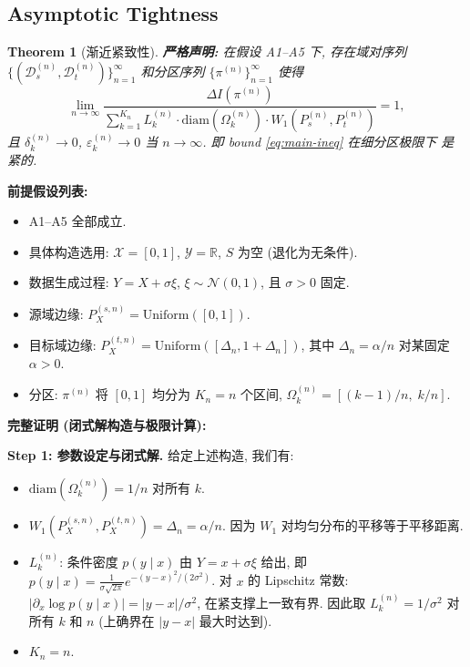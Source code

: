 \documentclass[12pt,a4paper]{article}
\newtheorem{theorem}{Theorem}[section]
\newcommand{\R}{\mathbb{R}}
\newcommand{\cX}{\mathcal{X}}
\newcommand{\cY}{\mathcal{Y}}
\newcommand{\cD}{\mathcal{D}}
\newcommand{\Wass}{W_1}
\newcommand{\diam}{\mathrm{diam}}
\begin{document}
\subsection{Asymptotic Tightness}

\begin{theorem}[渐近紧致性]\label{thm:tightness}
\textbf{严格声明:}
在假设 A1--A5 下, 存在域对序列
$\{(\cD_s^{(n)},\cD_t^{(n)})\}_{n=1}^{\infty}$ 和分区序列
$\{\pi^{(n)}\}_{n=1}^{\infty}$ 使得
\begin{equation}\label{eq:tightness}
    \lim_{n\to\infty}
    \frac{\Delta I(\pi^{(n)})}
         {\displaystyle\sum_{k=1}^{K_n}
          L_k^{(n)}\cdot\diam(\Omega_k^{(n)})\cdot
          \Wass(P^{(n)}_s,P^{(n)}_t)}
    = 1,
\end{equation}
且 $\delta_k^{(n)}\to0$, $\varepsilon_k^{(n)}\to0$ 当
$n\to\infty$. 即 bound \eqref{eq:main-ineq} 在细分区极限下
是紧的.
\end{theorem}

\medskip\noindent
\textbf{前提假设列表:}
\begin{itemize}
    \item A1--A5 全部成立.
    \item 具体构造选用: $\cX=[0,1]$, $\cY=\R$, $S$ 为空 (退化为无条件).
    \item 数据生成过程: $Y = X + \sigma\xi$, $\xi\sim\mathcal{N}(0,1)$,
          且 $\sigma>0$ 固定.
    \item 源域边缘: $P_X^{(s,n)} = \mathrm{Uniform}([0,1])$.
    \item 目标域边缘: $P_X^{(t,n)} = \mathrm{Uniform}([\Delta_n, 1+\Delta_n])$,
          其中 $\Delta_n = \alpha/n$ 对某固定 $\alpha>0$.
    \item 分区: $\pi^{(n)}$ 将 $[0,1]$ 均分为 $K_n=n$ 个区间,
          $\Omega_k^{(n)}=[(k-1)/n,\;k/n]$.
\end{itemize}

\medskip\noindent
\textbf{完整证明 (闭式解构造与极限计算):}

\medskip\noindent
\textbf{Step 1: 参数设定与闭式解.}
给定上述构造, 我们有:
\begin{itemize}
    \item $\diam(\Omega_k^{(n)}) = 1/n$ 对所有 $k$.
    \item $\Wass(P^{(s,n)}_X, P^{(t,n)}_X) = \Delta_n = \alpha/n$.
          因为 $W_1$ 对均匀分布的平移等于平移距离.
    \item $L_k^{(n)}$: 条件密度 $p(y\mid x)$ 由 $Y=x+\sigma\xi$ 给出,
          即 $p(y\mid x) = \frac{1}{\sigma\sqrt{2\pi}}
          e^{-(y-x)^2/(2\sigma^2)}$. 对 $x$ 的 Lipschitz 常数:
          $|\partial_x \log p(y\mid x)| = |y-x|/\sigma^2$,
          在紧支撑上一致有界. 因此取 $L_k^{(n)}=1/\sigma^2$ 对所有
          $k$ 和 $n$ (上确界在 $|y-x|$ 最大时达到).
    \item $K_n = n$.
\end{itemize}
\end{document}
